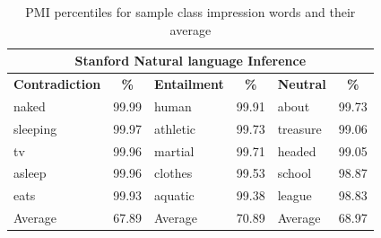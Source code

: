 \begin{table}[]
\begin{adjustbox}{max width=\columnwidth}
\begin{tabular}{|lc|lc|lc|}
\hline
\multicolumn{6}{|c|}{\textbf{Stanford Natural language Inference}}                                          \\ \hline
\textbf{Contradiction} & \textbf{\%} & \textbf{Entailment} & \textbf{\%} & \textbf{Neutral}   & \textbf{\%} \\ \hline
naked                  & 99.99       & human               & 99.91       & about              & 99.73       \\ \hline
sleeping               & 99.97       & athletic            & 99.73       & treasure           & 99.06       \\ \hline
tv                     & 99.96       & martial             & 99.71       & headed             & 99.05       \\ \hline
asleep                 & 99.96       & clothes             & 99.53       & school             & 98.87       \\ \hline
eats                   & 99.93       & aquatic             & 99.38       & league             & 98.83       \\ \hline \hline
Average     & 67.89       & Average  & 70.89       & Average & 68.97       \\ \hline
\end{tabular}
\end{adjustbox}
\caption{ PMI percentiles for sample class impression words and their average}
\label{table:snli-pmi-percentile}
\end{table}



